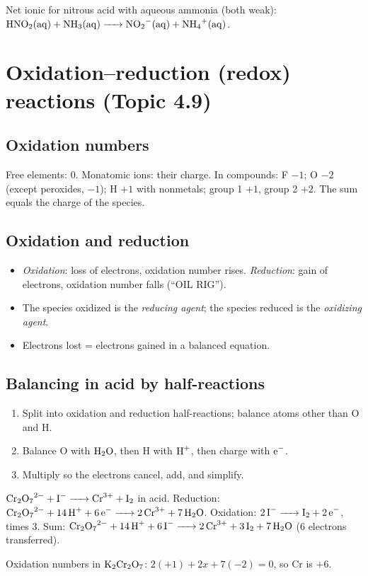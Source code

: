 \documentclass[11pt]{article}
\begin{document}
 Net ionic for nitrous acid with aqueous ammonia (both weak): $\ce{HNO2(aq) + NH3(aq) -> NO2-(aq) + NH4+(aq)}$.

\section{Oxidation--reduction (redox) reactions (Topic 4.9)}\label{t:4.9}
\subsection{Oxidation numbers}
Free elements: 0. Monatomic ions: their charge. In compounds: F $-1$; O $-2$ (except peroxides, $-1$); H $+1$ with nonmetals; group 1 $+1$, group 2 $+2$. The sum equals the charge of the species.
\subsection{Oxidation and reduction}
\begin{itemize}
\item \emph{Oxidation}: loss of electrons, oxidation number rises. \emph{Reduction}: gain of electrons, oxidation number falls (``OIL RIG'').
\item The species oxidized is the \emph{reducing agent}; the species reduced is the \emph{oxidizing agent}.
\item Electrons lost = electrons gained in a balanced equation.
\end{itemize}
\subsection{Balancing in acid by half-reactions}
\begin{enumerate}
\item Split into oxidation and reduction half-reactions; balance atoms other than O and H.
\item Balance O with $\ce{H2O}$, then H with $\ce{H+}$, then charge with $\ce{e-}$.
\item Multiply so the electrons cancel, add, and simplify.
\end{enumerate}
 $\ce{Cr2O7^2- + I- -> Cr^3+ + I2}$ in acid. Reduction: $\ce{Cr2O7^2- + 14H+ + 6e- -> 2Cr^3+ + 7H2O}$. Oxidation: $\ce{2I- -> I2 + 2e-}$, times 3. Sum: $\ce{Cr2O7^2- + 14H+ + 6I- -> 2Cr^3+ + 3I2 + 7H2O}$ (6 electrons transferred).

 Oxidation numbers in $\ce{K2Cr2O7}$: $2(+1) + 2x + 7(-2) = 0$, so Cr is $+6$.
\end{document}
